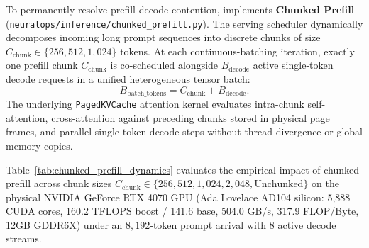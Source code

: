 To permanently resolve prefill-decode contention, \neuralops{} implements \textbf{Chunked Prefill} (\texttt{neuralops/inference/chunked\_prefill.py}). The serving scheduler dynamically decomposes incoming long prompt sequences into discrete chunks of size $C_{\text{chunk}} \in \{256, 512, 1{,}024\}$ tokens. At each continuous-batching iteration, exactly one prefill chunk $C_{\text{chunk}}$ is co-scheduled alongside $B_{\text{decode}}$ active single-token decode requests in a unified heterogeneous tensor batch:
\begin{equation}
B_{\text{batch\_tokens}} = C_{\text{chunk}} + B_{\text{decode}}.
\end{equation}
The underlying \texttt{PagedKVCache} attention kernel evaluates intra-chunk self-attention, cross-attention against preceding chunks stored in physical page frames, and parallel single-token decode steps without thread divergence or global memory copies.

Table~\ref{tab:chunked_prefill_dynamics} evaluates the empirical impact of chunked prefill across chunk sizes $C_{\text{chunk}} \in \{256, 512, 1{,}024, 2{,}048, \text{Unchunked}\}$ on the physical NVIDIA GeForce RTX 4070 GPU (Ada Lovelace AD104 silicon: 5,888 CUDA cores, 160.2 TFLOPS boost / 141.6 base, 504.0 GB/s, 317.9 FLOP/Byte, 12GB GDDR6X) under an $8{,}192$-token prompt arrival with 8 active decode streams.

